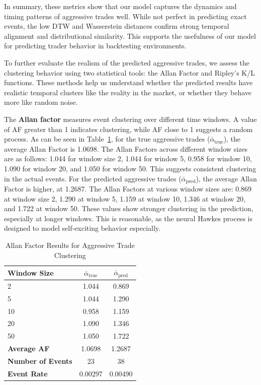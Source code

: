 In summary, these metrics show that our model captures the dynamics and timing patterns of aggressive trades well. While not perfect in predicting exact events, the low DTW and Wasserstein distances confirm strong temporal alignment and distributional similarity. This supports the usefulness of our model for predicting trader behavior in backtesting environments.



To further evaluate the realism of the predicted aggressive trades, we assess the clustering behavior using two statistical tools: the Allan Factor and Ripley's K/L functions. These methods help us understand whether the predicted results have realistic temporal clusters like the reality in the market, or whether they behave more like random noise.

The \textbf{Allan factor} measures event clustering over different time windows. A value of AF greater than 1 indicates clustering, while AF close to 1 suggests a random process. As can be seen in Table~\ref{tb:allan-factor}, for the true aggressive trades ($\bar{\alpha}_\text{true}$), the average Allan Factor is 1.0698. The Allan Factors across different window sizes are as follows: 1.044 for window size 2, 1.044 for window 5, 0.958 for window 10, 1.090 for window 20, and 1.050 for window 50. This suggests consistent clustering in the actual events. For the predicted aggressive trades ($\bar{\alpha}_\text{pred}$), the average Allan Factor is higher, at 1.2687. The Allan Factors at various window sizes are: 0.869 at window size 2, 1.290 at window 5, 1.159 at window 10, 1.346 at window 20, and 1.722 at window 50. These values show stronger clustering in the prediction, especially at longer windows. This is reasonable, as the neural Hawkes process is designed to model self-exciting behavior especially.

\begin{table}[H]
    \centering
    \caption{Allan Factor Results for Aggressive Trade Clustering}
    \label{tb:allan-factor}
    \begin{tabular}{lcc}
    \toprule
    \textbf{Window Size} & $\bar{\alpha}_\text{true}$ & $\bar{\alpha}_\text{pred}$\\
    \midrule
    2   & 1.044 & 0.869 \\
    5   & 1.044 & 1.290 \\
    10  & 0.958 & 1.159 \\
    20  & 1.090 & 1.346 \\
    50  & 1.050 & 1.722 \\
    \midrule
    \textbf{Average AF} & 1.0698 & 1.2687 \\
    \textbf{Number of Events} & 23 & 38 \\
    \textbf{Event Rate} & 0.00297 & 0.00490 \\
    \bottomrule
    \end{tabular}
\end{table}

